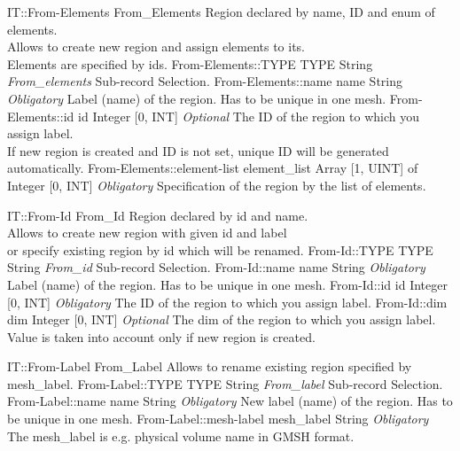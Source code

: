 \begin{RecordType}
	{IT::From-Elements}
	{From{\_}Elements}
	{} %
	{} %
	{{{Region declared by name, ID and enum of elements.}\\{
Allows to create new region and assign elements to its.}\\{
Elements are specified by ids.}}}
		\RecKey
			{From-Elements::TYPE}
			{TYPE}
			{{String}}
			{ \it{From{\_}elements} }
			{{{Sub-record Selection.}}}
		\RecKey
			{From-Elements::name}
			{name}
			{{String}}
			{ \it{Obligatory} }
			{{{Label (name) of the region. Has to be unique in one mesh.}}}
		\RecKey
			{From-Elements::id}
			{id}
			{{Integer [0, INT]}}
			{ \it{Optional} }
			{{{The ID of the region to which you assign label.}\\{
If new region is created and ID is not set, unique ID will be generated automatically.}}}
		\RecKey
			{From-Elements::element-list}
			{element{\_}list}
			{{Array [1, UINT] of }{Integer [0, INT]}}
			{ \it{Obligatory} }
			{{{Specification of the region by the list of elements.}}}
\end{RecordType}
\begin{RecordType}
	{IT::From-Id}
	{From{\_}Id}
	{} %
	{} %
	{{{Region declared by id and name.}\\{
Allows to create new region with given id and label}\\{
or specify existing region by id which will be renamed.}}}
		\RecKey
			{From-Id::TYPE}
			{TYPE}
			{{String}}
			{ \it{From{\_}id} }
			{{{Sub-record Selection.}}}
		\RecKey
			{From-Id::name}
			{name}
			{{String}}
			{ \it{Obligatory} }
			{{{Label (name) of the region. Has to be unique in one mesh.}}}
		\RecKey
			{From-Id::id}
			{id}
			{{Integer [0, INT]}}
			{ \it{Obligatory} }
			{{{The ID of the region to which you assign label.}}}
		\RecKey
			{From-Id::dim}
			{dim}
			{{Integer [0, INT]}}
			{ \it{Optional} }
			{{{The dim of the region to which you assign label. Value is taken into account only if new region is created.}}}
\end{RecordType}
\begin{RecordType}
	{IT::From-Label}
	{From{\_}Label}
	{} %
	{} %
	{{{Allows to rename existing region specified by mesh{\_}label.}}}
		\RecKey
			{From-Label::TYPE}
			{TYPE}
			{{String}}
			{ \it{From{\_}label} }
			{{{Sub-record Selection.}}}
		\RecKey
			{From-Label::name}
			{name}
			{{String}}
			{ \it{Obligatory} }
			{{{New label (name) of the region. Has to be unique in one mesh.}}}
		\RecKey
			{From-Label::mesh-label}
			{mesh{\_}label}
			{{String}}
			{ \it{Obligatory} }
			{{{The mesh{\_}label is e.g. physical volume name in GMSH format.}}}
\end{RecordType}
